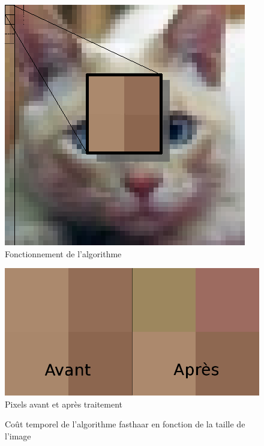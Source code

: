 \documentclass{article}
\begin{document}
\begin{figure}[!h]
\centering
\includegraphics[scale=0.8]{images/minichat.jpg}
\caption{Fonctionnement de l'algorithme}
\label{algo}
\end{figure}

\begin{figure}[!h]
\centering
\includegraphics[scale=0.3]{images/aprescompress.jpg}
\caption{Pixels avant et après traitement}
\label{after}
\end{figure}

\begin{figure}[!h]
\begin{center}

\caption{Coût temporel de l'algorithme fasthaar en fonction de la taille de l'image}
\label{bench1}
\end{center}
\end{figure}
\end{document}

